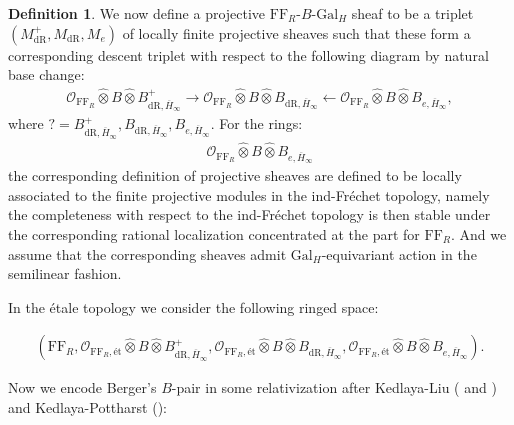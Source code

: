 \documentclass[12pt]{amsart}
\theoremstyle{definition}
\newtheorem{definition}[theorem]{Definition}
\numberwithin{equation}{section}
\begin{document}
\begin{definition}
We now define a projective $\mathrm{FF}_R$-$B$-$\mathrm{Gal}_H$ sheaf to be a triplet $(M^+_\mathrm{dR},M_\mathrm{dR},M_e)$ of locally finite projective sheaves such that these form a corresponding descent triplet with respect to the following diagram by natural base change:
\begin{align}
\mathcal{O}_{\mathrm{FF}_R}\widehat{\otimes}B\widehat{\otimes}B_{\mathrm{dR},\overline{H}_\infty}^+ \longrightarrow \mathcal{O}_{\mathrm{FF}_R}\widehat{\otimes}B\widehat{\otimes}B_{\mathrm{dR},\overline{H}_\infty}\longleftarrow \mathcal{O}_{\mathrm{FF}_R}\widehat{\otimes}B\widehat{\otimes}B_{e,\overline{H}_\infty},	
\end{align}
where $?=B_{\mathrm{dR},\overline{H}_\infty}^+,B_{\mathrm{dR},\overline{H}_\infty},B_{e,\overline{H}_\infty}$. For the rings:
\begin{align}
\mathcal{O}_{\mathrm{FF}_R}\widehat{\otimes}B\widehat{\otimes}B_{e,\overline{H}_\infty}	
\end{align}
the corresponding definition of projective sheaves are defined to be locally associated to the finite projective modules in the ind-Fr\'echet topology, namely the completeness with respect to the ind-Fr\'echet topology is then stable under the corresponding rational localization concentrated at the part for $\mathrm{FF}_R$. And we assume that the corresponding sheaves admit $\mathrm{Gal}_H$-equivariant action in the semilinear fashion.	
\end{definition}



\indent In the \'etale topology we consider the following ringed space:

\begin{align}
(\mathrm{FF}_R,\mathcal{O}_{\mathrm{FF}_R,\text{\'et}}\widehat{\otimes}B\widehat{\otimes}B_{\mathrm{dR},\overline{H}_\infty}^+,\mathcal{O}_{\mathrm{FF}_R,\text{\'et}}\widehat{\otimes}B\widehat{\otimes}B_{\mathrm{dR},\overline{H}_\infty},\mathcal{O}_{\mathrm{FF}_R,\text{\'et}}\widehat{\otimes}B\widehat{\otimes}B_{e,\overline{H}_\infty}).	
\end{align}


\indent Now we encode Berger's $B$-pair in some relativization after Kedlaya-Liu (\cite[Definition 9.3.11]{KL1} and \cite[Definition 4.8.2]{KL2}) and Kedlaya-Pottharst (\cite[Definition 2.17]{KP}):
\end{document}
